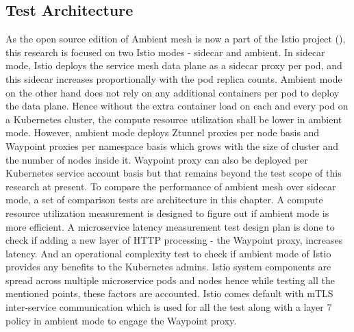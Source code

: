 \subsection{Test Architecture}
As the open source edition of Ambient mesh is now a part of the Istio project (\cite{istioHoward2022}), this research is focused on two Istio modes - sidecar and ambient. In sidecar mode, Istio deploys the service mesh data plane as a sidecar proxy per pod, and this sidecar increases proportionally with the pod replica counts. Ambient mode on the other hand does not rely on any additional containers per pod to deploy the data plane. Hence without the extra container load on each and every pod on a Kubernetes cluster, the compute resource utilization shall be lower in ambient mode. However, ambient mode deploys Ztunnel proxies per node basis and Waypoint proxies per namespace basis which grows with the size of cluster and the number of nodes inside it. Waypoint proxy can also be deployed per Kubernetes service account basis but that remains beyond the test scope of this research at present. To compare the performance of ambient mesh over sidecar mode, a set of comparison tests are architecture in this chapter. A compute resource utilization measurement is designed to figure out if ambient mode is more efficient. A microservice latency measurement test design plan is done to check if adding a new layer of HTTP processing - the Waypoint  proxy, increases latency. And an operational complexity test to check if ambient mode of Istio provides any benefits to the Kubernetes admins. Istio system components are spread across multiple microservice pods and nodes hence while testing all the mentioned points, these factors are accounted. Istio comes default with mTLS inter-service communication which is used for all the test along with a layer 7 policy in ambient mode to engage the Waypoint proxy.

